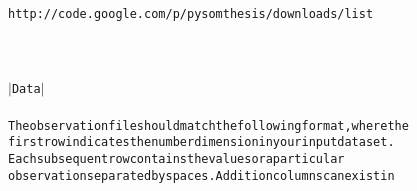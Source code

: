 {{\begin{tabbing}
{\texttt{http://code.google.com/p/pysom\dash{}thesis/downloads/list}}\\
\\
\\
{\texttt{\dash{}\dash{}\dash{}\dash{}\dash{}\dash{}\dash{}\dash{}}}\\
{\texttt{$|$\hspace{6pt}Data\hspace{6pt}$|$}}\\
{\texttt{\dash{}\dash{}\dash{}\dash{}\dash{}\dash{}\dash{}\dash{}}}\\
{\texttt{The\hspace{6pt}observation\hspace{6pt}file\hspace{6pt}should\hspace{6pt}match\hspace{6pt}the\hspace{6pt}following\hspace{6pt}format,\hspace{6pt}where\hspace{6pt}the}}\\
{\texttt{first\hspace{6pt}row\hspace{6pt}indicates\hspace{6pt}the\hspace{6pt}number\hspace{6pt}dimension\hspace{6pt}in\hspace{6pt}your\hspace{6pt}input\hspace{6pt}data\hspace{6pt}set.}}\\
{\texttt{Each\hspace{6pt}subsequent\hspace{6pt}row\hspace{6pt}contains\hspace{6pt}the\hspace{6pt}values\hspace{6pt}or\hspace{6pt}a\hspace{6pt}particular}}\\
{\texttt{observation\hspace{6pt}separated\hspace{6pt}by\hspace{6pt}spaces.\hspace{12pt}Addition\hspace{6pt}columns\hspace{6pt}can\hspace{6pt}exist\hspace{6pt}in}}\\

\end{tabbing}}}
